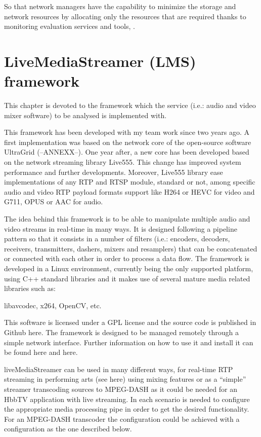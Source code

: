 So that network managers have the capability to minimize the storage and network resources by allocating only the resources that are required thanks to monitoring evaluation services and tools, .

\section{LiveMediaStreamer (LMS) framework}\label{SOA:LMS}

This chapter is devoted to the framework which the service (i.e.: audio and video mixer software) to be analysed is implemented with. 

This framework has been developed with my team work since two years ago. A first implementation was based on the network core of the open-source software UltraGrid (--ANNEXX--). One year after, a new core has been developed based on the network streaming library Live555. This change has improved system performance and further developments. Moreover, Live555 library ease implementations of any RTP and RTSP module, standard or not, among specific audio and video RTP payload formats support like H264 or HEVC for video and G711, OPUS or AAC for audio.

The idea behind this framework is to be able to manipulate multiple audio and video streams in real-time in many ways. It is designed following a pipeline pattern so that it consists in a number of filters (i.e.: encoders, decoders, receivers, transmitters, dashers, mixers and resamplers) that can be concatenated or connected with each other in order to process a data flow. The framework is developed in a Linux environment, currently being the only supported platform, using C++ standard libraries and it makes use of several mature media related libraries such as:

 libavcodec, x264, OpenCV, etc. 
 
 This software is licensed under a GPL license and the source code is published in Github here. The framework is designed to be managed remotely through a simple network interface. Further information on how to use it and install it can be found here and here. 

liveMediaStreamer can be used in many different ways, for real-time RTP streaming in performing arts (see here) using mixing features or as a “simple” streamer transcoding sources to MPEG-DASH as it could be needed for an HbbTV application with live streaming. In each scenario is needed to configure the appropriate media processing pipe in order to get the desired functionality. For an MPEG-DASH transcoder the configuration could be achieved with a configuration as the one described below.

